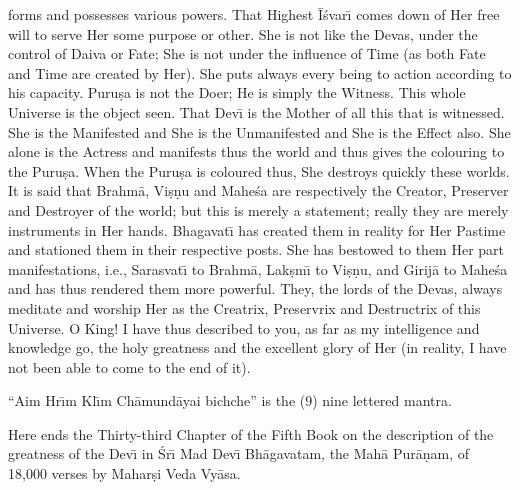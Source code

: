 forms and possesses various powers. That Highest \=I\'svar\={\i} comes down of Her free will to serve Her some purpose or other. She is not like the Devas, under the control of Daiva or Fate; She is not under the influence of Time (as both Fate and Time are created by Her). She puts always every being to action according to his capacity. Puru\d{s}a is not the Doer; He is simply the Witness. This whole Universe is the object seen. That Dev\={\i} is the Mother of all this that is witnessed. She is the Manifested and She is the Unmanifested and She is the Effect also. She alone is the Actress and manifests thus the world and thus gives the colouring to the Puru\d{s}a. When the Puru\d{s}a is coloured thus, She destroys quickly these worlds. It is said that Brahm\=a, Vi\d{s}\d{n}u and Mahe\'sa are respectively the Creator, Preserver and Destroyer of the world; but this is merely a statement; really they are merely instruments in Her hands. Bhagavat\={\i} has created them in reality for Her Pastime and stationed them in their respective posts. She has bestowed to them Her part manifestations, i.e., Sarasvat\={\i} to Brahm\=a, Lak\d{s}m\={\i} to Vi\d{s}\d{n}u, and Girij\=a to Mahe\'sa and has thus rendered them more powerful. They, the lords of the Devas, always meditate and worship Her as the Creatrix, Preservrix and Destructrix of this Universe. O King! I have thus described to you, as far as my intelligence and knowledge go, the holy greatness and the excellent glory of Her (in reality, I have not been able to come to the end of it).

``Aim Hr\={\i}m Kl\={\i}m Ch\=amund\=ayai bichche'' is the (9) nine lettered mantra.

Here ends the Thirty-third Chapter of the Fifth Book on the description of the greatness of the Dev\={\i} in \'Sr\={\i} Mad Dev\={\i} Bh\=agavatam, the Mah\=a Pur\=a\d{n}am, of 18,000 verses by Mahar\d{s}i Veda Vy\=asa.



